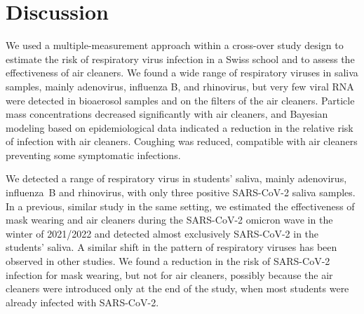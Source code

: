 \documentclass[fleqn,11pt]{wlscirep}
\begin{document}
\section*{Discussion}


We used a multiple-measurement approach within a cross-over study design to estimate the risk of respiratory virus infection in a Swiss school and to assess the effectiveness of air cleaners. We found a wide range of respiratory viruses in saliva samples, mainly adenovirus, influenza B, and rhinovirus, but very few viral RNA were detected in bioaerosol samples and on the filters of the air cleaners. Particle mass concentrations decreased significantly with air cleaners, and Bayesian modeling based on epidemiological data indicated a reduction in the relative risk of infection with air cleaners. Coughing was reduced, compatible with air cleaners preventing some symptomatic infections.


We detected a range of respiratory virus in students' saliva, mainly adenovirus, influenza~B and rhinovirus, with only three positive SARS-CoV-2 saliva samples. In a previous, similar study in the same setting, we estimated the effectiveness of mask wearing and air cleaners during the SARS-CoV-2 omicron wave in the winter of 2021/2022 and detected almost exclusively SARS-CoV-2 in the students' saliva.\cite{Banholzer2023PLoSMed} A similar shift in the pattern of respiratory viruses has been observed in other studies.\cite{Nygaard2023Lancet,Sauteur2022EuroSurv} We found a reduction in the risk of SARS-CoV-2 infection for mask wearing, but not for air cleaners, possibly because the air cleaners were introduced only at the end of the study, when most students were already infected with SARS-CoV-2. 

\end{document}
